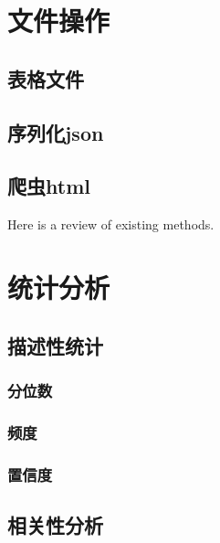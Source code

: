 \documentclass[]{book}
\begin{document}
\hypertarget{section-15}{%
\chapter{文件操作}\label{section-15}}

\hypertarget{section-16}{%
\section{表格文件}\label{section-16}}

\hypertarget{json}{%
\section{序列化json}\label{json}}

\hypertarget{html}{%
\section{爬虫html}\label{html}}

Here is a review of existing methods.

\hypertarget{section-17}{%
\chapter{统计分析}\label{section-17}}

\hypertarget{section-18}{%
\section{描述性统计}\label{section-18}}

\hypertarget{section-19}{%
\subsection{分位数}\label{section-19}}

\hypertarget{section-20}{%
\subsection{频度}\label{section-20}}

\hypertarget{section-21}{%
\subsection{置信度}\label{section-21}}

\hypertarget{section-22}{%
\section{相关性分析}\label{section-22}}
\end{document}
